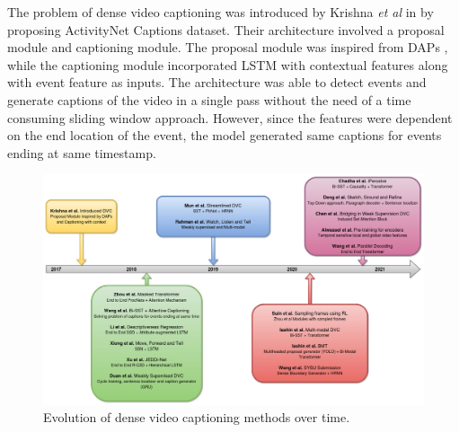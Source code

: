 \par The problem of dense video captioning was introduced by Krishna \textit{et al} in \cite{krishna2017densecaptioning} by proposing ActivityNet Captions dataset. Their architecture involved a proposal module and captioning module. The proposal module was inspired from DAPs \cite{Escorcia2016DAPsDA}, while the captioning module incorporated LSTM with contextual features along with event feature as inputs. The architecture was able to detect events and generate captions of the video in a single pass without the need of a time consuming sliding window approach.  However, since the features were dependent on the end location of the event, the model generated same captions for events ending at same timestamp.

\begin{figure}[h]
	\includegraphics[width=\linewidth]{assets/img/timeline.jpg}
	\caption{Evolution of dense video captioning methods over time.}
\end{figure}

